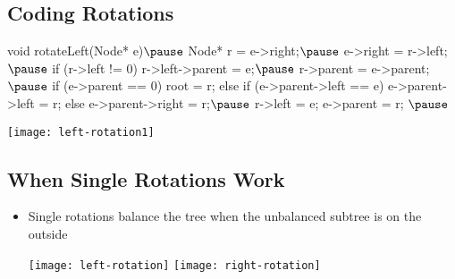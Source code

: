 
\begin{slide}
\section{Coding Rotations}

\begin{minipage}{10cm}
\begin{java}
void rotateLeft(Node* e)$\pause$
{
  Node* r = e->right;$\pause$
  e->right = r->left;$\pause$
  if (r->left != 0)
     r->left->parent = e;$\pause$
  r->parent = e->parent;$\pause$
  if (e->parent == 0)
     root = r;
  else if (e->parent->left == e)
     e->parent->left = r;
  else
     e->parent->right = r;$\pause$
  r->left = e;
  e->parent = r;
}$\pause$
\end{java}
\end{minipage}
\begin{minipage}{14cm}
\vspace*{-1ex}
\texttt{[image: left-rotation1]}
\end{minipage}
\end{slide}


\begin{slide}
\section{When Single Rotations Work}

\begin{PauseHighLight}
  \begin{itemize}
  \item Single rotations balance the tree when the unbalanced subtree is
    on the outside
    \begin{center}
      \texttt{[image: left-rotation]}\hfil
      \texttt{[image: right-rotation]}\pause
    \end{center}
  \end{itemize}
\end{PauseHighLight}

\end{slide}


